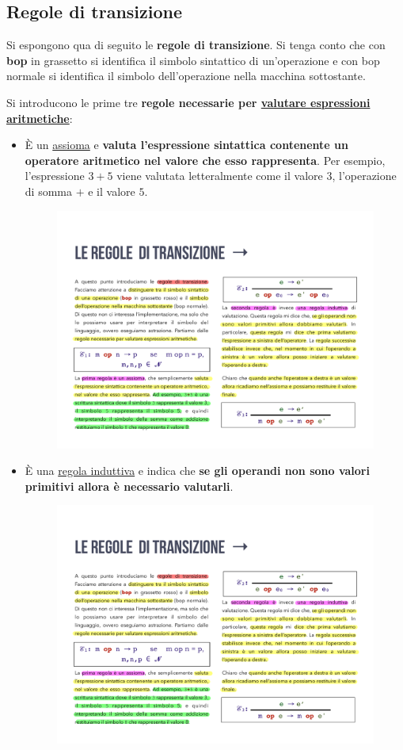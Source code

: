 \documentclass[a4paper]{article}
\begin{document}
	\subsection{Regole di transizione}\label{regole di transizione}
	
	Si espongono qua di seguito le \textcolor{Red3}{\textbf{regole di transizione}}. Si tenga conto che con \textbf{bop} in grassetto si identifica il simbolo sintattico di un'operazione e con bop normale si identifica il simbolo dell'operazione nella macchina sottostante.\newline
	
	\noindent
	Si introducono le prime tre \textbf{regole necessarie per \underline{valutare espressioni aritmetiche}}:
	\begin{itemize}
		\item È un \underline{assioma} e \textbf{valuta l'espressione sintattica contenente un operatore aritmetico nel valore che esso rappresenta}. Per esempio, l'espressione $3+5$ viene valutata letteralmente come il valore $3$, l'operazione di somma $+$ e il valore $5$.
		\begin{figure}[!htp]
			\centering
			\includegraphics[width=.65\textwidth]{img/regola_transizione-1.pdf}
		\end{figure}
		
		\item È una \underline{regola induttiva} e indica che \textbf{se gli operandi non sono valori primitivi allora è necessario valutarli}.
		\begin{figure}[!htp]
			\centering
			\includegraphics[width=.65\textwidth]{img/regola_transizione-2.pdf}
		\end{figure}
		

\end{itemize}
\end{document}
